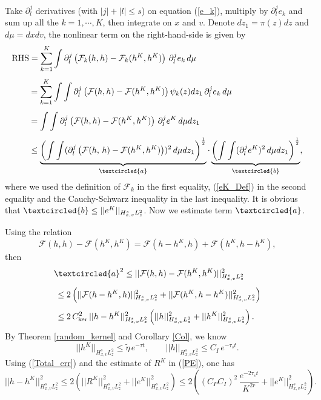 \documentclass[final,onefignum,onetabnum]{siamart171218}
\begin{document}
Take $\partial_l^j$ derivatives (with $|j|+|l|\leq s$) on equation (\ref{e_k}), multiply by $\partial_l^j e_k$ 
and sum up all the $k=1, \cdots, K$, then integrate on $x$ and $v$. 
Denote $dz_1 = \pi(z)dz$ and $d\mu = dxdv$,  the nonlinear term on the right-hand-side is given by 
\begin{align}
&\displaystyle \text{RHS} = \sum_{k=1}^{K} \int \partial_l^j \left(\mathcal F_{k}(h, h) -\mathcal F_{k}(h^K, h^K)\right)\, \partial_l^j e_k\, d\mu  \notag \\[4pt]
&\displaystyle \qquad = \sum_{k=1}^{K} \int \int\partial_l^j \left(\mathcal F(h, h) - \mathcal F(h^K, h^K)\right) \psi_k(z) dz_1\, \partial_l^j e_k\, d\mu  \notag\\[4pt]
&\displaystyle \qquad = \int \int \partial_l^j \left(\mathcal F(h, h) - \mathcal F(h^K, h^K)\right)\, \partial_l^j e^{K}\, d\mu dz_1 \notag\\[4pt]
&\displaystyle\label{App_R1} \qquad\leq  \underbrace{\left(\int\int (\partial_l^j \left(\mathcal F(h,\,h) - \mathcal F(h^K, h^K)\right))^2\, d\mu dz_1\right)^{\frac{1}{2}}}_{\textcircled{a}}
\cdot \underbrace{\left( \int \int (\partial_l^j e^K)^2\, d\mu dz_1\right)^{\frac{1}{2}}}_{\textcircled{b}}, 
\end{align}
where we used the definition of $\mathcal F_{k}$ in the first equality, (\ref{eK_Def}) in the second equality and
the Cauchy-Schwarz inequality in the last inequality. It is obvious that $\textcircled{b} \leq ||e^K||_{H_{x,v}^{s}L_z^2}$. Now we estimate term $\textcircled{a}$.

Using the relation
\begin{equation}\label{F_est} \mathcal F(h, h) -\mathcal F(h^K, h^K)= \mathcal F(h-h^K, h) + \mathcal F(h^K, h-h^K), 
\end{equation}
then 
\begin{align}
&\displaystyle \textcircled{a}^2 \leq ||\mathcal F(h, h) - \mathcal F(h^K, h^K)||_{H_{x,v}^{s}L_z^2}^2 \notag\\[4pt]
&\displaystyle\, \leq 2 \left( ||\mathcal F(h-h^K, h)||_{H_{x,v}^{s}L_z^2}^2 + ||\mathcal F(h^K, h-h^K)||_{H_{x,v}^{s}L_z^2}^2\right) \notag\\[4pt]
& \label{Term_a}\displaystyle\, \leq 2\, C_{\text{ker}}^2\, ||h-h^K||_{H_{x,v}^{s}L_z^2}^2 \left( ||h||_{H_{x,v}^{s}L_z^2}^2 + ||h^K||_{H_{x,v}^{s}L_z^2}^2 \right). 
\end{align}
By Theorem \ref{random_kernel} and Corollary \ref{Col}, we know
\begin{equation}\label{a1} ||h^K|| _{H_{x,v}^{s}L_z^2} \leq \tilde\eta\, e^{-\tau t}, \qquad ||h||_{H_{x,v}^{s}L_z^2} \leq C_{I}\, e^{-\tau_s t}. 
\end{equation}
Using (\ref{Total_err}) and the estimate of $R^K$ in (\ref{PE}), one has
\begin{equation}\label{a2} || h - h^K || _{H_{x,v}^{s}L_z^2}^2 \leq 2 \left( ||R^K||_{H_{x,v}^{s}L_z^2}^2 + ||e^K||_{H_{x,v}^{s}L_z^2}^2\right) 
\leq 2 \left( (C_P C_I)^2\, \frac{e^{-2 \tau_s t}}{K^{2r}} + ||e^K||_{H_{x,v}^{s}L_z^2}^2 \right).  \end{equation}
\end{document}
